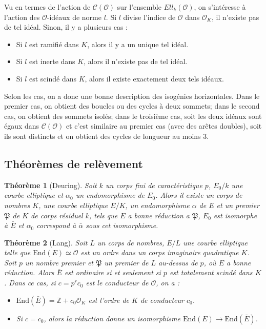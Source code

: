 \documentclass[11pt,a4paper]{article}
\newcommand{\Z}{\mathbb{Z}}
\renewcommand{\O}{\mathcal{O}}
\newcommand{\Cl}{\mathcal{C}}
\newcommand{\vers}{\rightarrow}
\newcommand{\End}{\mathrm{End}}
\renewcommand{\frak}{\mathfrak}
\newtheorem{thm}{Théorème}[subsection]
\theoremstyle{definition}
\begin{document}
Vu en termes de l'action de $\Cl(\O)$ sur l'ensemble $Ell_k(\O)$, on s'intéresse à l'action des $\O$-idéaux de norme $l$. Si $l$ divise l'indice de $\O$ dans $\O_K$, il n'existe pas de tel idéal. Sinon, il y a plusieurs cas :
\begin{itemize}
\item[•] Si $l$ est ramifié dans $K$, alors il y a un unique tel idéal.
\item[•] Si $l$ est inerte dans $K$, alors il n'existe pas de tel idéal.
\item[•] Si $l$ est scindé dans $K$, alors il existe exactement deux tels idéaux.
\end{itemize}

Selon les cas, on a donc une bonne description des isogénies horizontales. Dans le premier cas, on obtient des boucles ou des cycles à deux sommets; dans le second cas, on obtient des sommets isolés; dans le troisième cas, soit les deux idéaux sont égaux dans $\Cl(\O)$ et c'est similaire au premier cas (avec des arêtes doubles), soit ils sont distincts et on obtient des cycles de longueur au moins 3.


\subsection{Théorèmes de relèvement}


\begin{thm}[Deuring]
Soit $k$ un corps fini de caractéristique $p$, $E_0/k$ une courbe elliptique et $\alpha_0$ un endomorphisme de $E_0$. Alors il existe un corps de nombres $K$, une courbe elliptique $E/K$, un endomorphisme $\alpha$ de $E$ et un premier $\frak P$ de $K$ de corps résiduel $k$, tels que $E$ a bonne réduction a $\frak P$, $E_0$ est isomorphe à $\bar{E}$ et $\alpha_0$ correspond à $\bar{\alpha}$ sous cet isomorphisme.
\end{thm}


\begin{thm}[Lang]
Soit $L$ un corps de nombres, $E/L$ une courbe elliptique telle que $\End(E)\simeq \O$ est un ordre dans un corps imaginaire quadratique $K$. Soit $p$ un nombre premier et $\frak P$ un premier de $L$ au-dessus de $p$, où $E$ a bonne réduction. Alors $\bar{E}$ est ordinaire si et seulement si $p$ est totalement scindé dans $K$. Dans ce cas, si $c=p^r c_0$ est le conducteur de $\O$, on a :
\begin{itemize}
\item[(i)] $\End(\bar{E})=\Z+c_0 \O_K$ est l'ordre de $K$ de conducteur $c_0$.
\item[(ii)] Si $c=c_0$, alors la réduction donne un isomorphisme $\End(E)\vers\End(\bar{E})$.
\end{itemize}

\end{thm}
\end{document}
